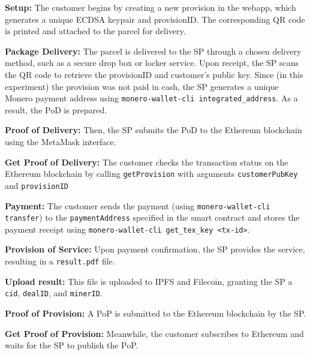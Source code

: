 \documentclass[pdftex,twocolumn,epjc3]{svjour3}
\begin{document}
\begin{enumerate}
  \setcounter{enumi}{-1}
  \item \textbf{Setup:} The customer begins by creating a new provision in the webapp, which generates a unique ECDSA keypair and provisionID. The corresponding QR code is printed and attached to the parcel for delivery.

  \item  \textbf{Package Delivery:}  The parcel is delivered to the SP through a chosen delivery method, such as a secure drop box or locker service. Upon receipt, the SP scans the QR code to retrieve the provisionID and customer's public key. Since (in this experiment) the provision was not paid in cash, the SP generates a unique Monero payment address using \texttt{monero-wallet-cli integrated\_address}. As a result, the PoD is prepared.

  \item \textbf{Proof of Delivery:} Then, the SP submits the PoD to the Ethereum blockchain using the MetaMask interface.

    \item \textbf{Get Proof of Delivery:} The customer checks the transaction status on the Ethereum blockchain by calling \texttt{getProvision} with arguments \texttt{customerPubKey} and \texttt{provisionID}

    \begin{sloppypar}
    \item \textbf{Payment:} The customer sends the payment (using \texttt{monero-wallet-cli transfer}) to the \texttt{paymentAddress} specified in the smart contract and stores the payment receipt using \texttt{monero-wallet-cli get\_tex\_key <tx-id>}.
    \end{sloppypar}

    \item \textbf{Provision of Service:} Upon payment confirmation, the SP provides the service, resulting in a \texttt{result.pdf} file.

  \item \textbf{Upload result:} This file is uploaded to IPFS and Filecoin, granting the SP a \texttt{cid}, \texttt{dealID}, and \texttt{minerID}.

  \item \textbf{Proof of Provision:} A PoP is submitted to the Ethereum blockchain by the SP.

    \item \textbf{Get Proof of Provision:} Meanwhile, the customer subscribes to Ethereum and waits for the SP to publish the PoP.



\end{enumerate}
\end{document}
